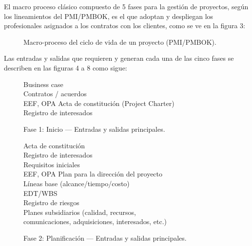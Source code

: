 \documentclass[12pt]
{charter}
\begin{document}
El macro proceso clásico compuesto de 5 fases para la gestión de proyectos, según los lineamientos del PMI/PMBOK, es el que adoptan y despliegan los profesionales asignados a los contratos con los clientes, como se ve en la figura 3:

\begin{figure}[h]
\centering
\begin{adjustbox}{max width=\linewidth} %
\end{adjustbox}
\caption{Macro-proceso del ciclo de vida de un proyecto (PMI/PMBOK).}
\label{fig:macro-pmi}
\end{figure}

\FloatBarrier

Las entradas y salidas que requieren y generan cada una de las cinco fases se describen en las figuras 4 a 8 como sigue: 

\begin{figure}[h]
\centering
{}
        {Business case\\Contratos / acuerdos\\EEF, OPA}
        {Acta de constituci\'on (Project Charter)\\Registro de interesados}
\caption{Fase 1: Inicio — Entradas y salidas principales.}
\label{fig:fase1}
\end{figure}

\begin{figure}[h]
\centering
{}
        {Acta de constituci\'on\\Registro de interesados\\Requisitos iniciales\\EEF, OPA}
        {Plan para la direcci\'on del proyecto\\L\'ineas base (alcance/tiempo/costo)\\EDT/WBS\\Registro de riesgos\\Planes subsidiarios (calidad, recursos,\\comunicaciones, adquisiciones, interesados, etc.)}
\caption{Fase 2: Planificaci\'on — Entradas y salidas principales.}
\label{fig:fase2}
\end{figure}
\end{document}
